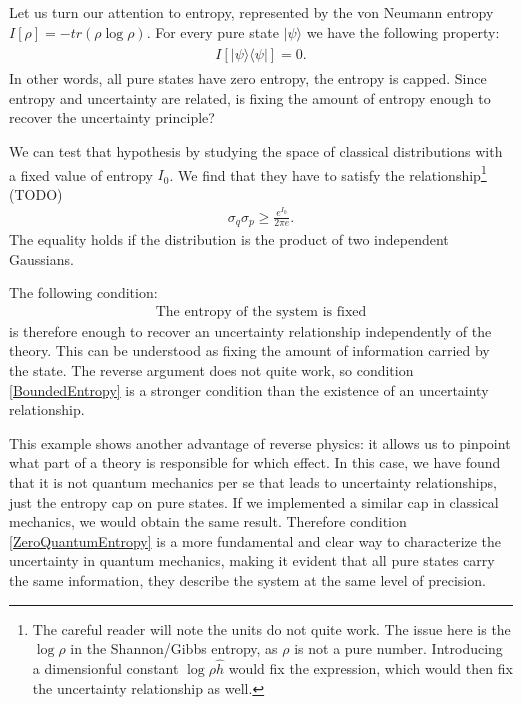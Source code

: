 \documentclass[10pt,twocolumn, nofootinbib]{revtex4-2}
\begin{document}
Let us turn our attention to entropy, represented by the von Neumann entropy $I[\rho] = - tr (\rho \log \rho)$. For every pure state $|\psi \rangle$ we have the following property:
\begin{align}\label{ZeroQuantumEntropy}
	\begin{split}
		I[|\psi\rangle\langle\psi|] = 0.
	\end{split}
\end{align}
In other words, all pure states have zero entropy, the entropy is capped. Since entropy and uncertainty are related, is fixing the amount of entropy enough to recover the uncertainty principle?

We can test that hypothesis by studying the space of classical distributions with a fixed value of entropy $I_0$. We find that they have to satisfy the relationship\footnote{The careful reader will note the units do not quite work. The issue here is the $\log \rho$ in the Shannon/Gibbs entropy, as $\rho$ is not a pure number. Introducing a dimensionful constant $\log \rho \hat{h}$ would fix the expression, which would then fix the uncertainty relationship as well. } (TODO)
\begin{align}\label{ClassicalUncertaintyPrinciple}
	\sigma_q \sigma_p \geq \frac{e^{I_0}}{2 \pi e}.
\end{align}
The equality holds if the distribution is the product of two independent Gaussians.

The following condition:
\begin{align}\label{BoundedEntropy}
	\text{The entropy of the system is fixed}
\end{align}
is therefore enough to recover an uncertainty relationship independently of the theory. This can be understood as fixing the amount of information carried by the state. The reverse argument does not quite work, so condition \eqref{BoundedEntropy} is a stronger condition than the existence of an uncertainty relationship.

This example shows another advantage of reverse physics: it allows us to pinpoint what part of a theory is responsible for which effect. In this case, we have found that it is not quantum mechanics per se that leads to uncertainty relationships, just the entropy cap on pure states. If we implemented a similar cap in classical mechanics, we would obtain the same result. Therefore condition \eqref{ZeroQuantumEntropy} is a more fundamental and clear way to characterize the uncertainty in quantum mechanics, making it evident that all pure states carry the same information, they describe the system at the same level of precision.
\end{document}
